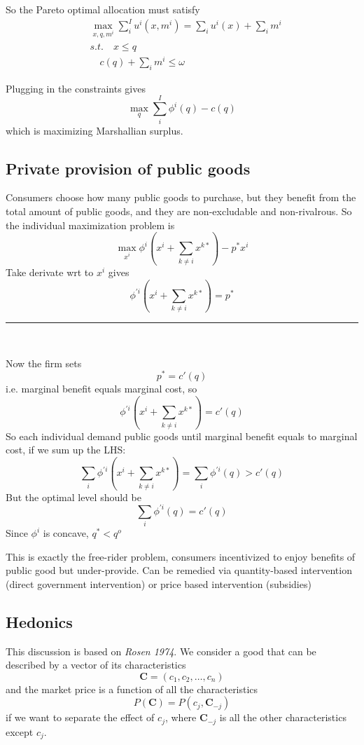 \documentclass[twocolumn, fleqn]{article}
\begin{document}
		So the Pareto optimal allocation must satisfy
		\begin{align*}
			&\max_{x,q,m^i} \sum_i^I u^i (x,m^i) = \sum_i u^i(x) +\sum_i m^i \\
			&s.t. \quad x \leq q\\
			&\quad c(q) +\sum_i m^i \leq \omega
		\end{align*}
		
		Plugging in the constraints gives 
		\[ \max_{q} \sum_i^I \phi^i(q)-c(q)\]
		which is maximizing Marshallian surplus. 
		
		\subsection{Private provision of public goods}
		Consumers choose how many public goods to purchase, but they benefit from the total amount of public goods, and they are non-excludable and non-rivalrous. So the individual maximization problem is 
		\[ \max_{x^i} \phi^i(x^i + \sum_{k\neq i} x^{k \ast})-p^\ast x^i\]
		Take derivate wrt to $x^i$ gives 
		\[\phi^{\prime i}(x^i + \sum_{k\neq i} x^{k \ast})=p^\ast\]
		
		\hrule\
		
		Now the firm sets 
		\[p^\ast = c'(q)\]
		i.e. marginal benefit equals marginal cost, so 
		\[\phi^{\prime i}(x^i + \sum_{k\neq i} x^{k \ast}) = c'(q)\]
		So each individual demand public goods until marginal benefit equals to marginal cost, if we sum up the LHS:
		\[\sum_i \phi^{\prime i}(x^i + \sum_{k\neq i} x^{k \ast}) =\sum_i \phi^{\prime i}(q)> c'(q)\]
		But the optimal level should be
		\[\sum_i \phi^{\prime i}(q)= c'(q)\]
		Since $\phi^i$ is concave, $q^\ast<q^o$
		
		This is exactly the free-rider problem, consumers incentivized to enjoy benefits of
		public good but under-provide. Can be remedied via quantity-based intervention (direct government intervention) or price based intervention (subsidies)
		
		
		\subsection{Hedonics}
		This discussion is based on \emph{Rosen 1974}. 
		We consider a good that can be described by a vector of its characteristics 
		\[\mathbf{C} = (c_1, c_2, \ldots, c_n)\]
		and the market price is a function of all the characteristics
		\[ P(\mathbf{C}) = P(c_j, \mathbf{C}_{-j})\]
		if we want to separate the effect of $c_j$, where $\mathbf{C}_{-j}$ is all the other characteristics except $c_j$.
		
\end{document}
